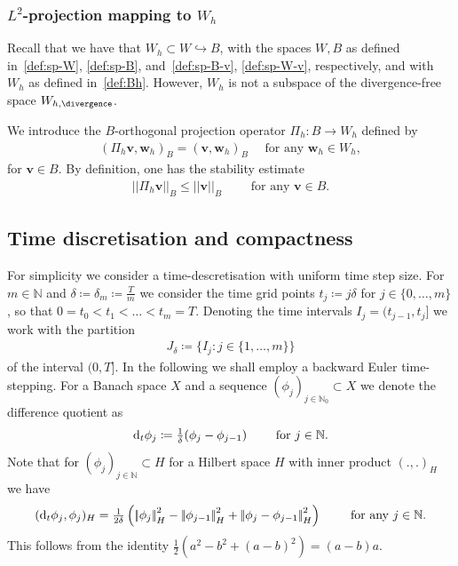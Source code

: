 \documentclass[reqno,a4paper]{amsart}
\def\norm#1{\left|\!\left| #1 \right|\!\right|}
\def\vec#1{\boldsymbol{#1}}
\def\d{{\rm d}}
\def\difft{\d_t}
\def\Bh{{W_h}}
\def\bv{\vec{v}}
\def\bw{\vec{w}}
\def\PiBh{{\Pi_h}}
\begin{document}
\subsubsection{$L^2$-projection mapping to $W_h$}

Recall that we have that $\Bh \subset W\hookrightarrow B$, with the spaces $W,B$ as defined in~\eqref{def:sp-W}, \eqref{def:sp-B}, and~\eqref{def:sp-B-v}, \eqref{def:sp-W-v}, respectively, and with $W_h$ as defined in~\eqref{def:Bh}. 
However, $W_h$ is not a subspace of the divergence-free space $W_{h,\divergence}$. 

We introduce the $B$-orthogonal projection operator $\PiBh \colon B \to \Bh $ defined by 
\begin{align}\label{def:PiBh}
	(\PiBh  \bv, \bw_h)_B = 	( \bv, \bw_h)_B \quad \text{ for any } \bw_h \in \Bh,
\end{align}
for $\bv \in B$.  
By definition, one has the stability estimate 
\begin{align}\label{def:PiBh-stab}
	\norm{\PiBh \bv}_B \leq	\norm{\bv}_B \qquad \text{ for any } \bv \in B.
\end{align} 

\subsection{Time discretisation and compactness}\label{sec:prel-timediscr} 

For simplicity we consider a time-descretisation with uniform time step size. 
%
For $m\in \mathbb{N}$ and $\delta  \coloneqq \delta_m \coloneqq \frac{T}{m}$ we consider the time grid points $t_j \coloneqq  j \delta$ 
for $j \in \{0,\ldots, m\}$
, so that  %
$0 = t_0 < t_1 < \ldots< t_m = T$. 
Denoting the time intervals $I_j  = (t_{j-1},t_j]$ we work with the  partition 
\begin{align*}
	J_\delta \coloneqq \{ I_j \colon j \in \{1, \ldots, m\}\}
\end{align*} 
of the interval $(0,T]$. 
%
In the following we shall employ a backward Euler time-stepping. 
For a Banach space $X$ and a sequence $(\phi_j)_{j \in \mathbb{N}_0} \subset X$ we denote the difference quotient as
\begin{align*}
	\difft \phi_j \coloneqq \tfrac{1}{\delta}(\phi_j - \phi_{j-1}) \qquad\text{ for } j \in \mathbb{N}. 
\end{align*}
Note that for  $(\phi_j)_{j \in \mathbb{N}} \subset H$ for a Hilbert space $H$ with inner product $(.,.)_H$ we have
\begin{align}\label{eq:difft}
	(\difft \phi_j,\phi_j)_H = \tfrac{1}{2\delta} \left(\norm{\phi_j}_H^2 - \norm{\phi_{j-1}}_H^2 + \norm{\phi_j - \phi_{j-1}}_H^2 \right) \qquad \text{ for any } j \in \mathbb{N}. 
\end{align}
This follows from the identity 
$\tfrac{1}{2}\left(a^2 - b^2 + (a-b)^2\right) = 	(a-b)a.$
\end{document}
